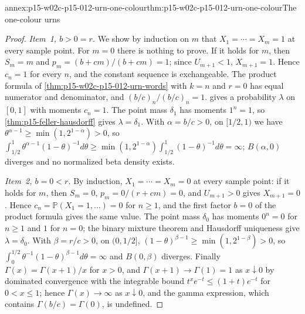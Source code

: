 \begin{annexitem}{annex:p15-w02c-p15-012-urn-one-colour}{thm:p15-w02c-p15-012-urn-one-colour}{The one-colour urns}
\begin{proof}
\emph{Item~1, \(b>0=r\).} We show by induction on \(m\) that
\(X_1=\cdots=X_m=1\) at every sample point. For \(m=0\) there is nothing
to prove. If it holds for \(m\), then \(S_m=m\) and
\(p_m=(b+cm)/(b+cm)=1\); since \(U_{m+1}<1\), \(X_{m+1}=1\).
Hence \(c_n=1\) for every \(n\), and the constant sequence is
exchangeable. The product formula of
\cref{thm:p15-w02c-p15-012-urn-words} with \(k=n\) and \(r=0\) has equal
numerator and denominator, and \((b/c)_n/(b/c)_n=1\).
 gives a probability \(\lambda\) on
\([0,1]\) with moments \(c_n=1\). The point mass \(\delta_1\) has moments
\(1^n=1\), so \cref{thm:p15-feller-hausdorff} gives \(\lambda=\delta_1\).
With \(\alpha=b/c>0\), on \([1/2,1)\) we have
\(\theta^{\alpha-1}\geq\min(1,2^{1-\alpha})>0\), so
\(\int_{1/2}^1\theta^{\alpha-1}(1-\theta)^{-1}d\theta
 \geq\min(1,2^{1-\alpha})\int_{1/2}^1(1-\theta)^{-1}d\theta=\infty\);
\(B(\alpha,0)\) diverges and no normalized beta density exists.

\emph{Item~2, \(b=0<r\).} By induction, \(X_1=\cdots=X_m=0\) at every
sample point: if it holds for \(m\), then \(S_m=0\),
\(p_m=0/(r+cm)=0\), and \(U_{m+1}>0\) gives \(X_{m+1}=0\). Hence
\(c_n=\mathbb P(X_1=1,\ldots)=0\) for \(n\geq1\), and the first factor
\(b=0\) of the product formula gives the same value. The point mass
\(\delta_0\) has moments \(0^n=0\) for \(n\geq1\) and \(1\) for \(n=0\);
the binary mixture theorem and Hausdorff uniqueness give
\(\lambda=\delta_0\). With \(\beta=r/c>0\), on \((0,1/2]\),
\((1-\theta)^{\beta-1}\geq\min(1,2^{1-\beta})>0\), so
\(\int_0^{1/2}\theta^{-1}(1-\theta)^{\beta-1}d\theta=\infty\) and
\(B(0,\beta)\) diverges. Finally
\(\Gamma(x)=\Gamma(x+1)/x\) for \(x>0\), and \(\Gamma(x+1)\to\Gamma(1)=1\)
as \(x\downarrow0\) by dominated convergence with the integrable bound
\(t^xe^{-t}\leq(1+t)e^{-t}\) for \(0<x\leq1\); hence
\(\Gamma(x)\to\infty\) as \(x\downarrow0\), and the gamma expression,
which contains \(\Gamma(b/c)=\Gamma(0)\), is undefined.
\end{proof}
\end{annexitem}
